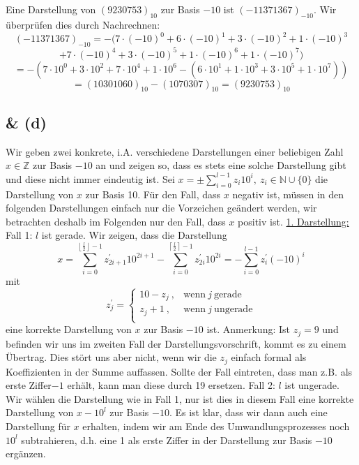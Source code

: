 \documentclass[11pt]{scrartcl}
\theoremstyle{dotless}
\newcommand{\floor}[1]{\left\lfloor #1\right\rfloor}
\newcommand{\ceil}[1]{\left\lceil #1\right\rceil}
\begin{document}
	\subsection{}
		Eine Darstellung von $(9230753)_{10}$ zur Basis $-10$ ist $(-11371367)_{-10}$. Wir überprüfen dies durch Nachrechnen:
		$$(-11371367)_{-10}=-(7\cdot (-10)^0+6\cdot (-10)^1+3\cdot (-10)^2+1\cdot (-10)^3$$$$+7\cdot (-10)^4+3\cdot (-10)^5+1\cdot (-10)^6+1\cdot (-10)^7)$$
		$$=-(7\cdot 10^0+3\cdot 10^2+7\cdot 10^4+1\cdot 10^6-(6\cdot 10^1+1\cdot 10^3+3\cdot 10^5+1\cdot 10^7))$$
		$$=(10301060)_{10}-(1070307)_{10}=(9230753)_{10}$$
	\subsection{\& (d)}
		Wir geben zwei konkrete, i.A. verschiedene Darstellungen einer beliebigen Zahl $x\in \mathbb{Z}$ zur Basis $-10$ an und zeigen so, dass es stets eine solche Darstellung gibt und diese nicht immer eindeutig ist.\newline
		Sei $x=\pm\sum_{i=0}^{l-1}z_i10^i,~z_i\in \mathbb{N}\cup \{0\}$ die Darstellung von $x$ zur Basis 10. Für den Fall, dass $x$ negativ ist, müssen in den folgenden Darstellungen einfach nur die Vorzeichen geändert werden, wir betrachten deshalb im Folgenden nur den Fall, dass $x$ positiv ist.\newline
		\underline{1. Darstellung:}\newline
		Fall 1: $l$ ist gerade.\newline
		Wir zeigen, dass die Darstellung
		$$x=\sum_{i=0}^{\floor{\frac{l}{2}}-1}z_{2i+1}^{\prime} 10^{2i+1}-\sum_{i=0}^{\ceil{\frac{l}{2}}-1}z_{2i}^{\prime} 10^{2i}=-\sum_{i=0}^{l-1}z_{i}^{\prime} (-10)^{i}$$
		mit
		$$z_j^{\prime}=\left\{\begin{array}{ll}
		10-z_j~,& \text{wenn}~j~ \text{gerade}\\
		z_j+1~,&\text{wenn}~j~ \text{ungerade}\\
		\end{array}\right.$$
		eine korrekte Darstellung von $x$ zur Basis $-10$ ist. Anmerkung: Ist $z_j=9$ und befinden wir uns im zweiten Fall der Darstellungsvorschrift, kommt es zu einem \glqq Übertrag\grqq. Dies stört uns aber nicht, wenn wir die $z_j$ einfach formal als Koeffizienten in der Summe auffassen. Sollte der Fall eintreten, dass man z.B. als erste \glqq Ziffer\grqq $-1$ erhält, kann man diese durch 19 ersetzen.\newline
		Fall 2: $l$ ist ungerade.\newline
		Wir wählen die Darstellung wie in Fall 1, nur ist dies in diesem Fall eine korrekte Darstellung von $x-10^l$ zur Basis $-10$. Es ist klar, dass wir dann auch eine Darstellung für $x$ erhalten, indem wir am Ende des Umwandlungsprozesses noch $10^l$ subtrahieren, d.h. eine 1 als erste Ziffer in der Darstellung zur Basis $-10$ ergänzen.\newline
\end{document}
